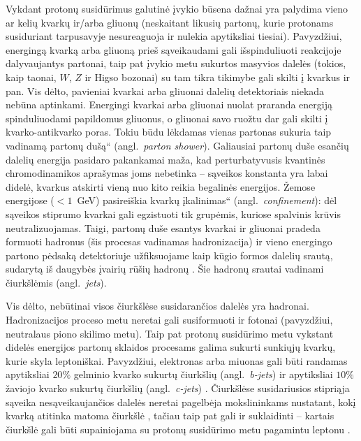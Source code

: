 \documentclass[a4paper, 12pt, oneside]{article}
\newcommand{\ltq}[1]{{\quotedblbase{}#1\textquotedblleft{}}}
\newlength\q
\begin{document}
Vykdant protonų susidūrimus galutinė įvykio būsena dažnai yra palydima vieno ar kelių kvarkų ir/arba gliuonų
(neskaitant likusių partonų, kurie protonams susiduriant tarpusavyje nesureaguoja ir nulekia apytiksliai tiesiai).
Pavyzdžiui, energingą kvarką arba gliuoną prieš sąveikaudami gali išspinduliuoti reakcijoje dalyvaujantys partonai,
taip pat įvykio metu sukurtos masyvios dalelės (tokios, kaip taonai, $W$, $Z$ ir Higso bozonai) su tam tikra
tikimybe gali skilti į kvarkus ir pan.
Vis dėlto, pavieniai kvarkai arba gliuonai dalelių detektoriais niekada nebūna aptinkami.
Energingi kvarkai arba gliuonai nuolat praranda energiją spinduliuodami papildomus gliuonus, o gliuonai savo ruožtu
dar gali skilti į kvarko-antikvarko poras.
Tokiu būdu lėkdamas vienas partonas sukuria taip vadinamą \ltq{partonų dušą} (angl.\ \textit{parton shower}).
Galiausiai partonų duše esančių dalelių energija pasidaro pakankamai maža, kad perturbatyvusis kvantinės chromodinamikos
aprašymas joms nebetinka -- sąveikos konstanta yra labai didelė, kvarkus atskirti vieną nuo kito reikia begalinės energijos.
Žemose energijose ($<1$~GeV) pasireiškia kvarkų \ltq{įkalinimas} (angl.\ \textit{confinement}): dėl sąveikos stiprumo
kvarkai gali egzistuoti tik grupėmis, kuriose spalvinis krūvis neutralizuojamas.
Taigi, partonų duše esantys kvarkai ir gliuonai pradeda formuoti hadronus (šis procesas vadinamas hadronizacija)
ir vieno energingo partono pėdsaką detektoriuje užfiksuojame kaip kūgio formos dalelių srautą, sudarytą iš daugybės
įvairių rūšių hadronų \cite{Jets}.
Šie hadronų srautai vadinami čiurkšlėmis (angl.\ \textit{jets}).

Vis dėlto, nebūtinai visos čiurkšlėse susidarančios dalelės yra hadronai.
Hadronizacijos proceso metu neretai gali susiformuoti ir fotonai (pavyzdžiui, neutralaus piono skilimo metu).
Taip pat protonų susidūrimo metu vykstant didelės energijos partonų sklaidos procesams galima sukurti sunkiųjų kvarkų,
kurie skyla leptoniškai.
Pavyzdžiui, elektronas arba miuonas gali būti randamas apytiksliai $20\%$ gelminio kvarko sukurtų čiurkšlių
(angl.\ \textit{b-jets}) ir apytiksliai $10\%$ žaviojo kvarko sukurtų čiurkšlių (angl.\ \textit{c-jets}) \cite{LeptonJets}.
Čiurkšlėse susidariusios stipriąja sąveika nesąveikaujančios dalelės neretai pagelbėja mokslininkams nustatant,
kokį kvarką atitinka matoma čiurkšlė \cite{LeptonJets}, tačiau taip pat gali ir suklaidinti -- kartais čiurkšlė gali
būti supainiojama su protonų susidūrimo metu pagamintu leptonu \cite{DY2013, DY7TeVatlas, DY2015, DY8TeVatlas, DY2019, EleID, MuonID}.
\end{document}
